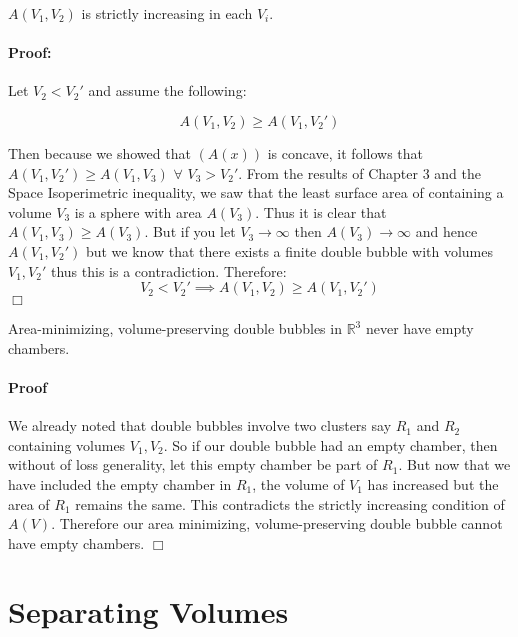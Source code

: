 \documentclass[a4paper,12pt]{report}
\begin{document}
\begin{corollary}
$A(V_{1},V_{2})$ is strictly increasing in each $V_{i}$.
\end{corollary}

\paragraph{Proof:} Let $V_{2} < V_{2}'$ and assume the following:

\begin{equation}
A(V_{1},V_{2}) \geq A(V_{1},V_{2}')
\end{equation}

Then because we showed that $(A(x))$ is concave, it follows that $ A(V_{1},V_{2}') \geq A(V_{1},V_{3})$ $\forall$ $V_{3} > V_{2}'$. From the results of Chapter 3 and the Space Isoperimetric inequality, we saw that the least surface area of containing a volume $V_{3}$ is a sphere with area $A(V_{3})$. Thus it is clear that $A(V_{1},V_{3}) \geq A(V_{3})$. But if you let $V_{3} \rightarrow \infty$ then $A(V_{3}) \rightarrow \infty$ and hence $A(V_{1},V_{2}')$ but we know that there exists a finite double bubble with volumes $V_{1},V_{2}'$ thus this is a contradiction. Therefore:
\[
V_{2} < V_{2}' \implies A(V_{1},V_{2}) \geq A(V_{1},V_{2}')
\] \hfill $\Box$

\begin{theorem}
Area-minimizing, volume-preserving double bubbles in $\mathbb{R}^{3}$ never have empty chambers.
\end{theorem}

\paragraph{Proof} We already noted that double bubbles involve two clusters say $R_{1}$ and $R_{2}$ containing volumes $V_{1}, V_{2}$. So if our double bubble had an empty chamber, then without of loss generality, let this empty chamber be part of $R_{1}$. But now that we have included the empty chamber in $R_{1}$, the volume of $V_{1}$ has increased but the area of $R_{1}$ remains the same. This contradicts the strictly increasing condition of $A(V)$. Therefore our area minimizing, volume-preserving double bubble cannot have empty chambers. \hfill $\Box$\newline

\section{Separating Volumes}
\end{document}
